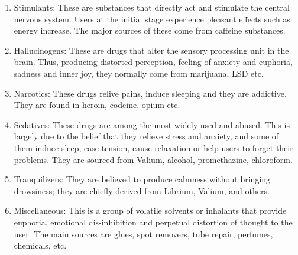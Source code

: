 \documentclass{report}
\begin{document}
\begin{enumerate}
    \item Stimulants: These are substances that directly act and stimulate the central nervous system. Users at the initial stage experience pleasant effects such as energy increase. The major sources of these come from caffeine substances.
    
    \item Hallucinogens: These are drugs that alter the sensory processing unit in the brain. Thus, producing distorted perception, feeling  of anxiety and euphoria, sadness and inner joy, they normally come from marijuana, LSD etc.
    
    \item Narcotics: These drugs relive pains, induce sleeping and they are addictive. They are found in heroin, codeine, opium etc.
    
    \item Sedatives: These drugs are among the most widely used and abused. This is largely due to the belief  that they relieve stress and anxiety, and some of them  induce  sleep, ease tension, cause relaxation or help users to forget their problems. They are sourced from Valium, alcohol, promethazine, chloroform.
    
    \item Tranquilizers: They are believed to produce calmness without bringing drowsiness; they are chiefly derived from Librium, Valium, and others. 
    
    \item Miscellaneous: This is a group of volatile solvents or inhalants that provide euphoria, emotional dis-inhibition and perpetual distortion of thought to the user. The main  sources are glues, spot removers, tube repair, perfumes, chemicals, etc. 
\end{enumerate}
\end{document}
